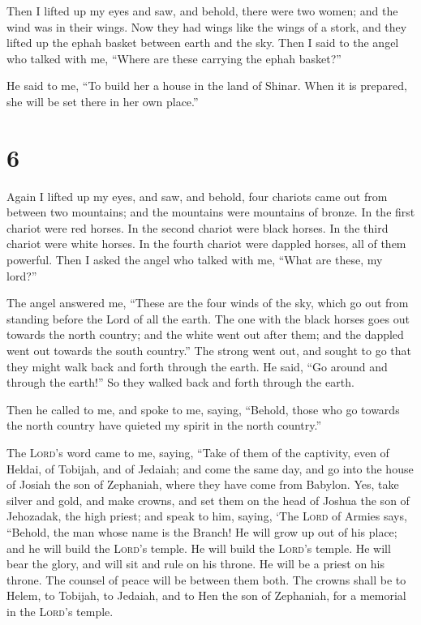  Then I lifted up my eyes and saw, and behold, there were
two women; and the wind was in their wings. Now they had wings like the
wings of a stork, and they lifted up the ephah basket between earth and
the sky.  Then I said to the angel who talked with me,
``Where are these carrying the ephah basket?''

 He said to me, ``To build her a house in the land of
Shinar. When it is prepared, she will be set there in her own place.''

\hypertarget{section-5}{%
\section{6}\label{section-5}}

 Again I lifted up my eyes, and saw, and behold, four
chariots came out from between two mountains; and the mountains were
mountains of bronze.  In the first chariot were red
horses. In the second chariot were black horses.  In the
third chariot were white horses. In the fourth chariot were dappled
horses, all of them powerful.  Then I asked the angel who
talked with me, ``What are these, my lord?''

 The angel answered me, ``These are the four winds of the
sky, which go out from standing before the Lord of all the earth.
 The one with the black horses goes out towards the north
country; and the white went out after them; and the dappled went out
towards the south country.''  The strong went out, and
sought to go that they might walk back and forth through the earth. He
said, ``Go around and through the earth!'' So they walked back and forth
through the earth.

 Then he called to me, and spoke to me, saying, ``Behold,
those who go towards the north country have quieted my spirit in the
north country.''

 The \textsc{Lord}'s word came to me, saying,
 ``Take of them of the captivity, even of Heldai, of
Tobijah, and of Jedaiah; and come the same day, and go into the house of
Josiah the son of Zephaniah, where they have come from Babylon.
 Yes, take silver and gold, and make crowns, and set them
on the head of Joshua the son of Jehozadak, the high priest;
 and speak to him, saying, `The \textsc{Lord} of Armies
says, ``Behold, the man whose name is the Branch! He will grow up out of
his place; and he will build the \textsc{Lord}'s temple. 
He will build the \textsc{Lord}'s temple. He will bear the glory, and
will sit and rule on his throne. He will be a priest on his throne. The
counsel of peace will be between them both.  The crowns
shall be to Helem, to Tobijah, to Jedaiah, and to Hen the son of
Zephaniah, for a memorial in the \textsc{Lord}'s temple.

